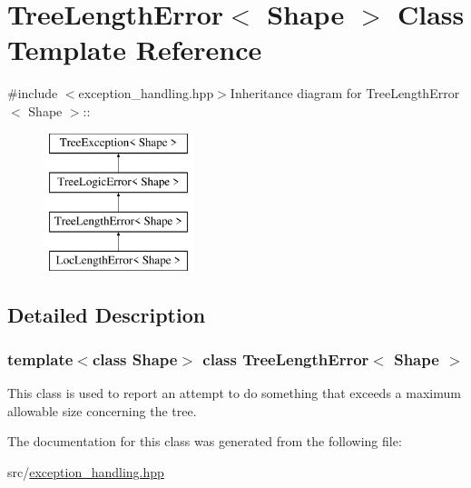 \hypertarget{classTreeLengthError}{
\section{TreeLengthError$<$ Shape $>$ Class Template Reference}
\label{classTreeLengthError}
}


{\ttfamily \#include $<$exception\_\-handling.hpp$>$}Inheritance diagram for TreeLengthError$<$ Shape $>$::\begin{figure}[H]
\begin{center}
\leavevmode
\includegraphics[height=4cm]{classTreeLengthError}
\end{center}
\end{figure}


\subsection{Detailed Description}
\subsubsection*{template$<$class Shape$>$ class TreeLengthError$<$ Shape $>$}

This class is used to report an attempt to do something that exceeds a maximum allowable size concerning the tree. 

The documentation for this class was generated from the following file:\begin{DoxyCompactItemize}
\item 
src/\hyperlink{exception__handling_8hpp}{exception\_\-handling.hpp}\end{DoxyCompactItemize}
